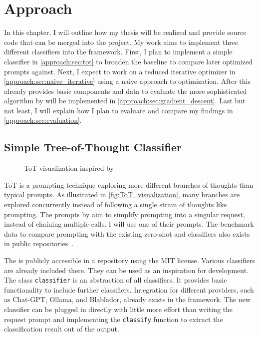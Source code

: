 \chapter{Approach}
\label{ch:Approach}
In this chapter, I will outline how my thesis will be realized and provide source code that can be merged into the \LiSSA project.
My work aims to implement three different classifiers into the framework.
First, I plan to implement a simple \ToT classifier in \autoref{approach:sec:tot} to broaden the baseline to compare later optimized prompts against.
Next, I expect to work on a reduced iterative optimizer in \autoref{approach:sec:naive_iterative} using a naive approach to optimization.
After this already provides basic components and data to evaluate the more sophisticated algorithm by  will be implemented in \autoref{approach:sec:gradient_descent}.
Last but not least, I will explain how I plan to evaluate and compare my findings in \autoref{approach:sec:evaluation}.

\section{Simple Tree-of-Thought Classifier}
\label{approach:sec:tot}

\begin{figure}
    \centering
    
    \caption{\Ac{ToT} visualization inspired by  }
    \label{fig:ToT_visualization}
\end{figure}

\Ac{ToT} is a prompting technique exploring more different branches of thoughts than typical \CoT prompts.
As illustrated in \autoref{fig:ToT_visualization}, many branches are explored concurrently instead of following a single strain of thoughts like \CoT prompting.
The prompts by  aim to simplify \ToT prompting into a singular request, instead of chaining multiple calls.
I will use one of their prompts.
The benchmark data to compare \ToT prompting with the existing zero-shot and \CoT classifiers also exists in public repositories~\cite{fuchss2022ArDoCoBenchmark, hey2025ReplicationPackage}.

The \LiSSAf is publicly accessible in a repository using the MIT license. Various classifiers are already included there.
They can be used as an inspiration for development.
The class \verb|classifier| is an abstraction of all classifiers.
It provides basic functionality to include further classifiers.
Integration for different \LLM providers, such as Chat-GPT, Ollama, and Blablador, already exists in the framework.
The new classifier can be plugged in directly with little more effort than writing the request prompt and implementing the \verb|classify| function to extract the classification result out of the \LLM output.

